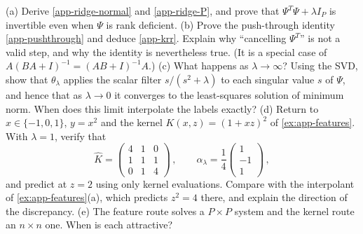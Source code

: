 \documentclass[11pt]{article}
\begin{document}
\begin{exercise}
\label{ex:app-ridge}
(a) Derive \eqref{app-ridge-normal} and \eqref{app-ridge-P}, and prove that $\Psi^T\Psi+\lambda I_P$ is invertible even when $\Psi$ is rank deficient.
(b) Prove the push-through identity \eqref{app-pushthrough} and deduce \eqref{app-krr}. Explain why ``cancelling $\Psi^T$'' is not a valid step, and why the identity is nevertheless true. (It is a special case of $A(BA+I)^{-1} = (AB+I)^{-1}A$.)
(c) What happens as $\lambda\to\infty$? Using the SVD, show that $\theta_\lambda$ applies the scalar filter $s/(s^2+\lambda)$ to each singular value $s$ of $\Psi$, and hence that as $\lambda\to 0$ it converges to the least-squares solution of minimum norm. When does this limit interpolate the labels exactly?
(d) Return to $x\in\{-1,0,1\}$, $y=x^2$ and the kernel $K(x,z) = (1+xz)^2$ of \cref{ex:app-features}. With $\lambda = 1$, verify that
%
\begin{equation*}
    \hat K = \begin{pmatrix} 4 & 1 & 0 \\ 1 & 1 & 1 \\ 0 & 1 & 4 \end{pmatrix}\,,\qquad
    \alpha_\lambda = \frac{1}{4}\begin{pmatrix} 1 \\ -1 \\ 1 \end{pmatrix}\,,
\end{equation*}
%
and predict at $z=2$ using only kernel evaluations. Compare with the interpolant of \cref{ex:app-features}(a), which predicts $z^2=4$ there, and explain the direction of the discrepancy.
(e) The feature route solves a $P\times P$ system and the kernel route an $n\times n$ one. When is each attractive?
\end{exercise}
\end{document}
